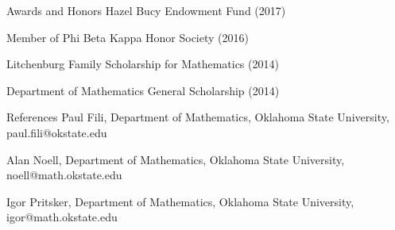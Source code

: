 \documentclass{resume} %
\begin{document}
\begin{rSection}{Awards and Honors}
Hazel Bucy Endowment Fund (2017)

Member of Phi Beta Kappa Honor Society (2016)

Litchenburg Family Scholarship for Mathematics (2014)

Department of Mathematics General  Scholarship (2014)
\end{rSection}
\newpage
\begin{rSection}{References}
Paul Fili, Department of Mathematics, Oklahoma State University, paul.fili@okstate.edu

Alan Noell, Department of Mathematics, Oklahoma State University, noell@math.okstate.edu

Igor Pritsker, Department of Mathematics, Oklahoma State University, igor@math.okstate.edu
\end{rSection}
\end{document}
